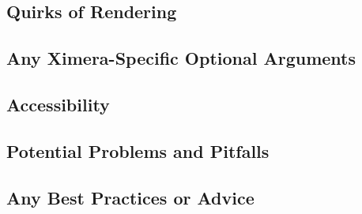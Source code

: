 \documentclass{ximera}
\begin{document}
    \subsection*{Quirks of Rendering}
    
    
    
    \subsection*{Any Ximera-Specific Optional Arguments}
    
    
    
    \subsection*{Accessibility}
    
    
    
    \subsection*{Potential Problems and Pitfalls}
    
    
    
    \subsection*{Any Best Practices or Advice}
    
    

    
\end{document}
